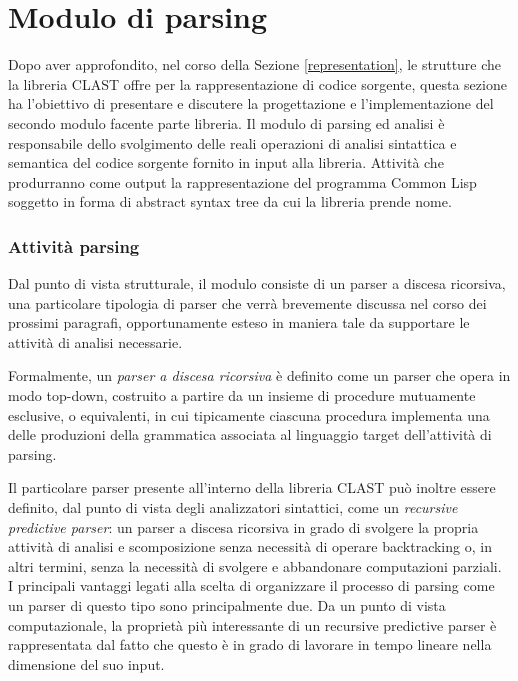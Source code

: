 \section{Modulo di parsing}
\label{parsing}

Dopo aver approfondito, nel corso della Sezione \ref{representation}, le
strutture che la libreria CLAST offre per la rappresentazione di codice
sorgente, questa sezione ha l’obiettivo di presentare e discutere la
progettazione e l'implementazione del secondo modulo facente parte libreria. Il
modulo di parsing ed analisi è responsabile dello svolgimento delle reali
operazioni di analisi sintattica e semantica del codice sorgente fornito in
input alla libreria. Attività che produrranno come output la rappresentazione
del programma Common Lisp soggetto in forma di abstract syntax tree da cui la
libreria prende nome.\\

\subsubsection{Attività parsing}

Dal punto di vista strutturale, il modulo consiste di un parser a discesa
ricorsiva, una particolare tipologia di parser che verrà brevemente discussa nel
corso dei prossimi paragrafi, opportunamente esteso in maniera tale da
supportare le attività di analisi necessarie.

Formalmente, un \textit{parser a discesa ricorsiva} è definito come un parser
che opera in modo top-down, costruito a partire da un insieme di procedure
mutuamente esclusive, o equivalenti, in cui tipicamente ciascuna procedura
implementa una delle produzioni della grammatica associata al linguaggio target
dell’attività di parsing.

Il particolare parser presente all’interno della libreria CLAST può inoltre
essere definito, dal punto di vista degli analizzatori sintattici, come un
\textit{recursive predictive parser}: un parser a discesa ricorsiva in grado di
svolgere la propria attività di analisi e scomposizione senza necessità di
operare backtracking o, in altri termini, senza la necessità di svolgere e
abbandonare computazioni parziali.\\

I principali vantaggi legati alla scelta di organizzare il processo di parsing
come un parser di questo tipo sono principalmente due. Da un punto di vista
computazionale, la proprietà più interessante di un recursive predictive parser
è rappresentata dal fatto che questo è in grado di lavorare in tempo lineare
nella dimensione del suo input.

